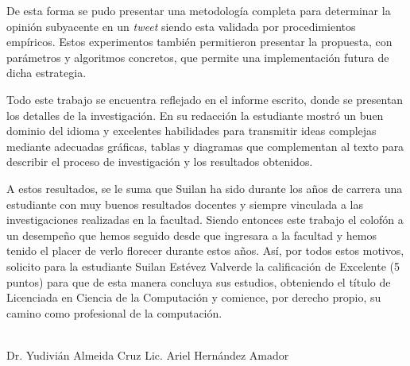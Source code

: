 \begin{opinion}
De esta forma se pudo presentar una metodología completa para determinar la opinión subyacente en un \emph{tweet} siendo esta validada por procedimientos empíricos. Estos experimentos también permitieron presentar la propuesta, con parámetros y algoritmos concretos, que permite una implementación futura de dicha estrategia.

Todo este trabajo se encuentra reflejado en el informe escrito, donde se presentan los detalles de la investigación. En su redacción la estudiante mostró un buen dominio del idioma y excelentes habilidades para transmitir ideas complejas mediante adecuadas gráficas, tablas y diagramas que complementan al texto para describir el proceso de investigación y los resultados obtenidos.

A estos resultados, se le suma que Suilan ha sido durante los años de carrera una estudiante con muy buenos resultados docentes y siempre vinculada a las investigaciones realizadas en la facultad. Siendo entonces este trabajo el colofón a un desempeño que hemos seguido desde que ingresara a la facultad y hemos tenido el placer de verlo florecer durante estos años. Así, por todos estos motivos, solicito para la estudiante Suilan Estévez Valverde la calificación de Excelente (5 puntos) para que de esta manera concluya sus estudios, obteniendo el título de Licenciada en Ciencia de la Computación y comience, por derecho propio, su camino como profesional de la computación.

\vfill
\begin{flushleft}
\underline{\hspace{140pt}}\hfill \underline{\hspace{140pt}}\\
Dr. Yudivián Almeida Cruz \hfill Lic. Ariel Hernández Amador \hspace*{7pt}
\end{flushleft}
\end{opinion}